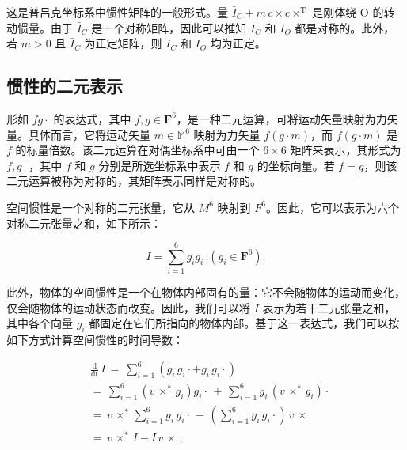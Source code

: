 \documentclass[10pt,a4paper]{book}
\theoremstyle{thmstyle} %
\theoremstyle{defstyle} %
\theoremstyle{prostyle} %
\begin{document}
这是普吕克坐标系中惯性矩阵的一般形式。量 $\bar{I}_{C}+m\,c\times c\times^{\mathrm{T}}$ 是刚体绕 O 的转动惯量。由于 $\bar{I}_{C}$ 是一个对称矩阵，因此可以推知 $I_{C}$ 和 $I_{O}$ 都是对称的。此外，若 $m>0$ 且 $\bar{I}_{C}$ 为正定矩阵，则 $I_{C}$ 和 $I_{O}$ 均为正定。



\subsection{惯性的二元表示}





形如 $fg\cdot$ 的表达式，其中 $f,g\in\mathbf{F}^6$，是一种二元运算，可将运动矢量映射为力矢量。具体而言，它将运动矢量 $m\in\mathbb{M}^6$ 映射为力矢量 $f(g\cdot m)$，而 $f(g\cdot m)$ 是 $f$ 的标量倍数。该二元运算在对偶坐标系中可由一个 $6\times6$ 矩阵来表示，其形式为 $f,g^{\top}$，其中 $f$ 和 $g$ 分别是所选坐标系中表示 $f$ 和 $g$ 的坐标向量。若 $f=g$，则该二元运算被称为对称的，其矩阵表示同样是对称的。



空间惯性是一个对称的二元张量，它从 $M^{6}$ 映射到 $F^{6}$。因此，它可以表示为六个对称二元张量之和，如下所示：



$$
I = \sum _ { i = 1 } ^{6} g _ { i } g _ { i } \, .   \left( g _ { i } \in \mathbf { F } ^{6} \right) .
$$



此外，物体的空间惯性是一个在物体内部固有的量：它不会随物体的运动而变化，仅会随物体的运动状态而改变。因此，我们可以将 $I$ 表示为若干二元张量之和，其中各个向量 $g_i$ 都固定在它们所指向的物体内部。基于这一表达式，我们可以按如下方式计算空间惯性的时间导数：



$$
{ \begin{array}{rl} & { { \frac { \mathrm { d } } { \mathrm { d } t } } \, I \, = \, \sum _ { i = 1 } ^{6} \left( { \dot { g } } _ { i } \, g _ { i } \cdot + g _ { i } \, { \dot { g } } _ { i } \cdot \right) } \\& {  = \, \sum _ { i = 1 } ^{6} \left( v \, \times ^{*} \, g _ { i } \right) g _ { i } \cdot \, + \, \sum _ { i = 1 } ^{6} g _ { i } \, \left( v \, \times ^{*} \, g _ { i } \right) \cdot } \\& {  = \, v \, \times ^{*} \, \sum _ { i = 1 } ^{6} g _ { i } \, g _ { i } \cdot \, - \, \left( \sum _ { i = 1 } ^{6} g _ { i } \, g _ { i } \cdot \right) \, v \, \times } \\& {  = \, v \, \times ^{*} \, I - I \, v \, \times \, , } \end{array} }
$$
\end{document}
